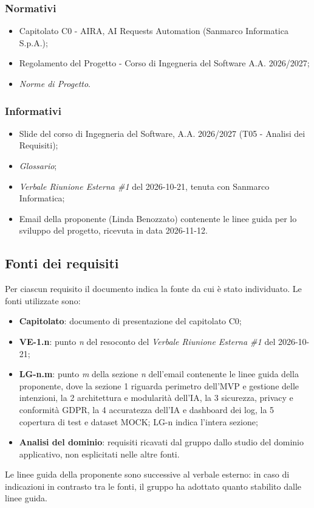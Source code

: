 \subsubsection{Normativi}
	\begin{itemize}
		\item Capitolato C0 - AIRA, AI Requests Automation (Sanmarco Informatica S.p.A.);
		\item Regolamento del Progetto - Corso di Ingegneria del Software A.A. 2026/2027;
		\item \textit{Norme di Progetto}.
	\end{itemize}

\subsubsection{Informativi}
	\begin{itemize}
		\item Slide del corso di Ingegneria del Software, A.A. 2026/2027 (T05 - Analisi dei Requisiti);
		\item \textit{Glossario};
		\item \textit{Verbale Riunione Esterna \#1} del 2026-10-21, tenuta con Sanmarco Informatica;
		\item Email della proponente (Linda Benozzato) contenente le linee guida per lo sviluppo del progetto, ricevuta in data 2026-11-12.
	\end{itemize}

\subsection{Fonti dei requisiti}
Per ciascun requisito il documento indica la fonte da cui è stato individuato. Le fonti utilizzate sono:
	\begin{itemize}
		\item \textbf{Capitolato}: documento di presentazione del capitolato C0;
		\item \textbf{VE-1.n}: punto \textit{n} del resoconto del \textit{Verbale Riunione Esterna \#1} del 2026-10-21;
		\item \textbf{LG-n.m}: punto \textit{m} della sezione \textit{n} dell'email contenente le linee guida della proponente, dove la sezione 1 riguarda perimetro dell'MVP e gestione delle intenzioni, la 2 architettura e modularità dell'IA, la 3 sicurezza, privacy e conformità GDPR, la 4 accuratezza dell'IA e dashboard dei log, la 5 copertura di test e dataset MOCK; LG-n indica l'intera sezione;
		\item \textbf{Analisi del dominio}: requisiti ricavati dal gruppo dallo studio del dominio applicativo, non esplicitati nelle altre fonti.
	\end{itemize}
Le linee guida della proponente sono successive al verbale esterno: in caso di indicazioni in contrasto tra le fonti, il gruppo ha adottato quanto stabilito dalle linee guida.
